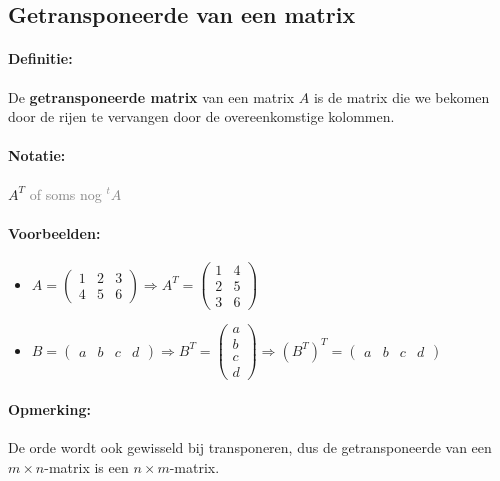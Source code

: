 \documentclass[12pt,twoside]{article}
\begin{document}
\subsection{Getransponeerde van een matrix}

\paragraph*{Definitie:} De {\bf getransponeerde matrix} van een matrix $A$ is de matrix die we bekomen door de rijen te vervangen door de overeenkomstige kolommen.

\paragraph*{Notatie:} $A^T$ \textcolor{gray}{of soms nog ${}^tA$}

\paragraph*{Voorbeelden:}
\begin{itemize}
\item $A=
  \begin{pmatrix}
    1 & 2 & 3\\
    4 & 5 & 6
  \end{pmatrix} \Rightarrow
  A^T=
  \begin{pmatrix}
    1 & 4\\
    2 & 5\\
    3 & 6
  \end{pmatrix}
  $
\item $B=
  \begin{pmatrix}
    a & b & c & d
  \end{pmatrix} \Rightarrow
  B^T=
  \begin{pmatrix}
    a\\
    b\\
    c\\
    d
  \end{pmatrix} \Rightarrow
  \left(B^T\right)^T=
  \begin{pmatrix}
    a & b & c & d
  \end{pmatrix}
  $
\end{itemize}

\paragraph*{Opmerking:} De orde wordt ook gewisseld bij transponeren, dus de getransponeerde van een $m \times n$-matrix is een $n \times m$-matrix.
\end{document}
